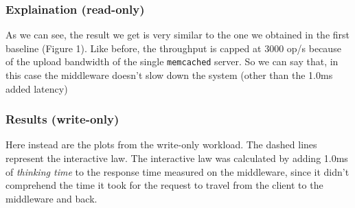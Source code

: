 \documentclass[11pt,a4paper]{article}
\renewcommand{\t}[1]{%
	{\texttt{#1}}}
\begin{document}
\subsubsection{Explaination (read-only)}

As we can see, the result we get is very similar to the one we obtained in the
first baseline (Figure 1).  Like before, the throughput is capped at 3000 op/s
because of the upload bandwidth of the single \t{memcached} server.
So we can say that, in this case the
middleware doesn't slow down the system (other than the 1.0ms added latency)

\subsubsection{Results (write-only)}

Here instead are the plots from the write-only workload.
The dashed lines represent the interactive law. The interactive law was
calculated by adding 1.0ms of \emph{thinking time} to the response time
measured on the middleware, since it didn't comprehend the time it took for the
request to travel from the client to the middleware and back.
\end{document}
